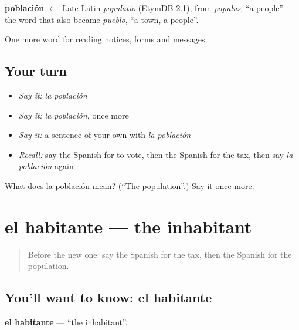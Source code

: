\begin{cousinweb}
\textbf{población} $\leftarrow$ Late Latin \emph{populatio} (EtymDB 2.1), from \emph{populus}, \textquotedblleft{}a people\textquotedblright{} — the word that also became \emph{pueblo}, \textquotedblleft{}a town, a people\textquotedblright{}.
\end{cousinweb}

\begin{grammarlens}[title={What you've built}]
One more word for reading notices, forms and messages.
\end{grammarlens}

\subsection*{Your turn}
\begin{itemize}
\raggedright
  \item \emph{Say it:} \emph{la población}
  \item \emph{Say it:} \emph{la población}, once more
  \item \emph{Say it:} a sentence of your own with \emph{la población}
  \item \emph{Recall:} say the Spanish for to vote, then the Spanish for the tax, then say \emph{la población} again
\end{itemize}

\begin{tcolorbox}[breakable,colback=teal!4,colframe=teal!35!black,title={Before you move on}]
What does la población mean? (\textquotedblleft{}The population\textquotedblright{}.) Say it once more.
\end{tcolorbox}
\section[el habitante]{el habitante — the inhabitant}

\label{lesson:ES-C507-habitante}



\begin{quote}
Before the new one: say the Spanish for the tax, then the Spanish for the population.
\end{quote}

\subsection*{You'll want to know: el habitante}
\textbf{el habitante} — \textquotedblleft{}the inhabitant\textquotedblright{}.

